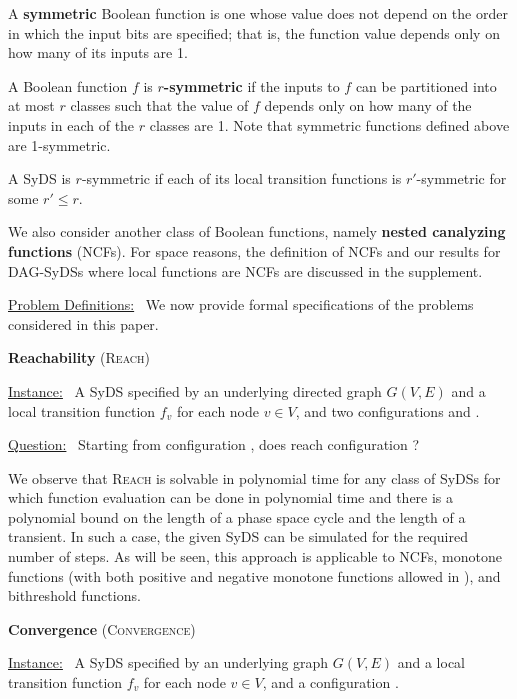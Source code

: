 A \textbf{symmetric} Boolean function is one whose
value does not depend on the order in
which the input bits are specified;
that is, the function value depends only on how many
of its inputs are 1.

A Boolean function $f$ is \textbf{$r$-symmetric}
if the inputs to $f$ can be partitioned into at most $r$ classes
such that the value of $f$ depends only on how many of the
inputs in each of the $r$ classes are 1.
Note that symmetric functions defined above are 1-symmetric.

A SyDS is $r$-symmetric
if each of its local transition
functions is $r'$-symmetric for some $r' \leq r$.

We also consider another class of Boolean
functions, namely  \textbf{nested canalyzing functions} (NCFs).
For space reasons, the definition of NCFs and our results for DAG-SyDSs
where local functions are NCFs are discussed in the supplement.

\smallskip
\noindent
\underline{\textsf{Problem Definitions:}}~ We now provide
formal specifications of the problems considered in this paper.

\smallskip
\noindent
\textbf{Reachability} (\textsc{Reach})

\smallskip
\noindent
\underline{\textsf{Instance:}}~ A SyDS \cals{} specified 
by an underlying directed
graph $G(V,E)$ and a local transition function $f_v$ for each node $v \in V$,
and two configurations \calc{} and \cald{}. 

\noindent
\underline{\textsf{Question:}}~ Starting from configuration \calc,
does \cals{} reach configuration \cald? 

We observe that \textsc{Reach} is solvable in polynomial time for
any class of SyDSs for which function evaluation can be done in
polynomial time and there is a polynomial bound on the length of a
phase space cycle and the length of a transient.  In such a case,
the given SyDS can be simulated for the required number of steps.
As will be seen, this approach is applicable to NCFs, monotone
functions (with both positive and negative monotone functions allowed
in \cals{}), and bithreshold functions.

\smallskip
\noindent
\textbf{Convergence} (\textsc{Convergence})

\smallskip
\noindent
\underline{\textsf{Instance:}}~ A SyDS \cals{} specified 
by an underlying
graph $G(V,E)$ and a local transition function $f_v$ for each node $v \in V$,
and a configuration \calc{}. 

